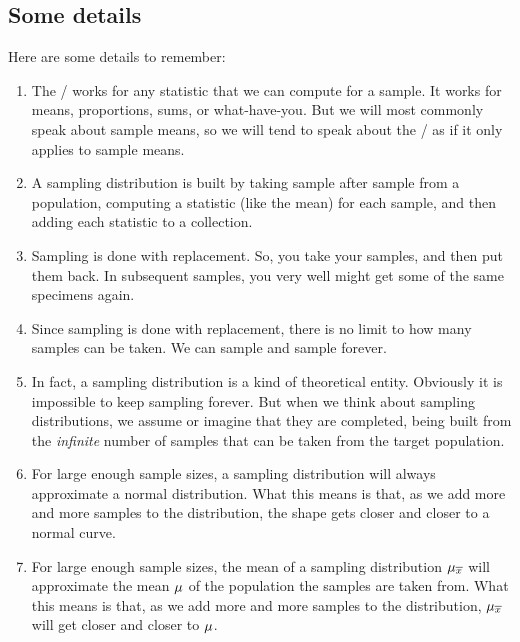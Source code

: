 \documentclass[../../../main.tex]{subfiles}
\begin{document}
\subsection{Some details}

Here are some details to remember:

\begin{enumerate}

  \item The \CLT/ works for any statistic that we can compute for a sample. It works for means, proportions, sums, or what-have-you. But we will most commonly speak about sample means, so we will tend to speak about the \CLT/ as if it only applies to sample means. 

  \item A sampling distribution is built by taking sample after sample from a population, computing a statistic (like the mean) for each sample, and then adding each statistic to a collection.
  
    \item Sampling is done with replacement. So, you take your samples, and then put them back. In subsequent samples, you very well might get some of the same specimens again.
  
  \item Since sampling is done with replacement, there is no limit to how many samples can be taken. We can sample and sample forever.
  
  \item In fact, a sampling distribution is a kind of theoretical entity. Obviously it is impossible to keep sampling forever. But when we think about sampling distributions, we assume or imagine that they are completed, being built from the \emph{infinite} number of samples that can be taken from the target population.

  \item For large enough sample sizes, a sampling distribution will always approximate a normal distribution. What this means is that, as we add more and more samples to the distribution, the shape gets closer and closer to a normal curve.
  
  \item For large enough sample sizes, the mean of a sampling distribution $\SamplingMean/$ will approximate the mean $\mu$ of the population the samples are taken from. What this means is that, as we add more and more samples to the distribution, $\SamplingMean/$ will get closer and closer to $\mu$.


\end{enumerate}
\end{document}
